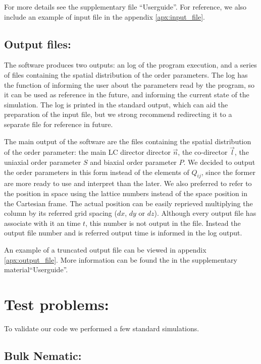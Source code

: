 \documentclass[final,5p,times,twocolumn]{elsarticle}
\begin{document}
For more details see the
supplementary file ``Userguide''.
For reference, we also include an
example of input file in the appendix \ref{apx:input_file}.

\subsection{Output files:}\label{sec:output_files}

The software produces two outputs: an log of the program execution,
and a series of files containing the spatial distribution of the order
parameters. The log has the function of informing the user about the
parameters read by the program, so it can be used as reference in the
future, and informing the current state of the simulation. The log is
printed in the standard output, which can aid the preparation of the
input file, but we strong recommend redirecting it to a separate file
for reference in future.

The main output of the software are the files containing the spatial
distribution of the order parameter: the main LC director director
$\vec{n}$, the co-director $\vec{l}$, the uniaxial order parameter $S$
and biaxial order parameter $P$. We decided to output the order
parameters in this form instead of the elements of $Q_{ij}$, since the
former are more ready to use and interpret than the later.  We also
preferred to refer to the position in space using the lattice numbers
instead of the space position in the Cartesian frame. The actual
position can be easily reprieved multiplying the column by its
referred grid spacing ($dx$, $dy$ or $dz$). Although every output file
has associate with it an time $t$, this number is not output in the
file. Instead the output file number and is referred output time is
informed in the log output. 

An example of a truncated output file
can be viewed in appendix \ref{apx:output_file}.  More information can
be found the in the supplementary material``Userguide''.

\section{Test problems:}

To validate our code we performed a few standard simulations. 

\subsection{Bulk Nematic:}
\end{document}

